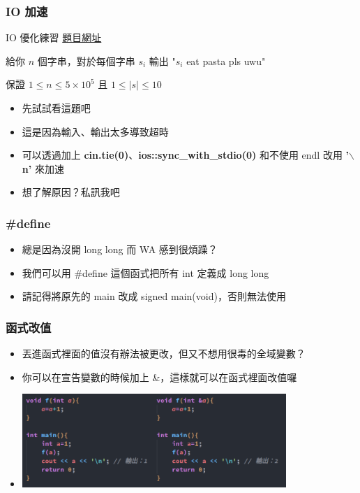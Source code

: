 \documentclass[mathserif]{beamer}
\begin{document}
\begin{frame}
    \frametitle{IO 加速}
    \begin{block}{IO 優化練習}
        \href{https://codeforces.com/group/S6XjkGb6qB/contest/403070/problem/A}{題目網址}

        給你 $n$ 個字串，對於每個字串 $s_i$ 輸出 "$s_i$ eat pasta pls uwu"

        保證 $1 \leq n \leq 5 \times 10^5$ 且 $1 \leq \mid s \mid \leq 10$
    \end{block}
    \begin{itemize}
        \item {先試試看這題吧}
        \item<2-> 這是因為輸入、輸出太多導致超時
        \item<2-> 可以透過加上 \textbf{cin.tie(0)}、\textbf{ios::sync\_with\_stdio(0)} 和不使用 endl 改用 \textbf{'$\backslash$ n'} 來加速
        \item<3-> 想了解原因？私訊我吧
    \end{itemize}
\end{frame}

\begin{frame}
    \frametitle{\#define}
    \begin{itemize}
        \item 總是因為沒開 long long 而 WA 感到很煩躁？
        \item<2-> 我們可以用 \#define 這個函式把所有 int 定義成 long long
        \item<3-> 請記得將原先的 main 改成 signed main(void)，否則無法使用
    \end{itemize}
\end{frame}

\begin{frame}
    \frametitle{函式改值}
    \begin{itemize}
        \item 丟進函式裡面的值沒有辦法被更改，但又不想用很毒的全域變數？
        \item 你可以在宣告變數的時候加上 \&，這樣就可以在函式裡面改值囉
        \vspace{0.5cm}
        \item \includegraphics[width=10.0cm]{img/code_3.png}
    \end{itemize}
\end{frame}
\end{document}
